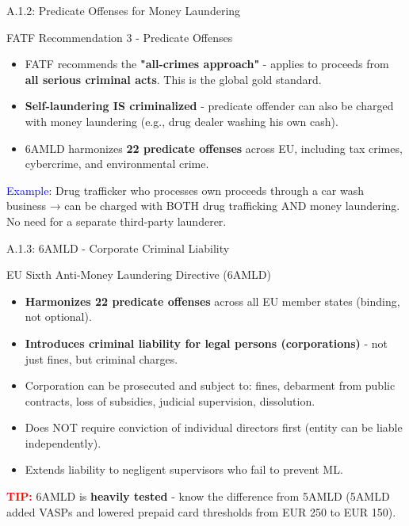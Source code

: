 \documentclass{beamer}
\begin{document}
	\begin{frame}{A.1.2: Predicate Offenses for Money Laundering}
		\begin{block}{FATF Recommendation 3 - Predicate Offenses}
			\begin{itemize}
				\item FATF recommends the \textbf{"all-crimes approach"} - applies to proceeds from \textbf{all serious criminal acts}. This is the global gold standard.
				\item \textbf{Self-laundering IS criminalized} - predicate offender can also be charged with money laundering (e.g., drug dealer washing his own cash).
				\item 6AMLD harmonizes \textbf{22 predicate offenses} across EU, including tax crimes, cybercrime, and environmental crime.
			\end{itemize}
		\end{block}
		\textcolor{blue}{Example:} Drug trafficker who processes own proceeds through a car wash business → can be charged with BOTH drug trafficking AND money laundering. No need for a separate third-party launderer.
	\end{frame}
	
	\begin{frame}{A.1.3: 6AMLD - Corporate Criminal Liability}
		\begin{block}{EU Sixth Anti-Money Laundering Directive (6AMLD)}
			\begin{itemize}
				\item \textbf{Harmonizes 22 predicate offenses} across all EU member states (binding, not optional).
				\item \textbf{Introduces criminal liability for legal persons (corporations)} - not just fines, but criminal charges.
				\item Corporation can be prosecuted and subject to: fines, debarment from public contracts, loss of subsidies, judicial supervision, dissolution.
				\item Does NOT require conviction of individual directors first (entity can be liable independently).
				\item Extends liability to negligent supervisors who fail to prevent ML.
			\end{itemize}
		\end{block}
		\textcolor{red}{\textbf{TIP:}} 6AMLD is \textbf{heavily tested} - know the difference from 5AMLD (5AMLD added VASPs and lowered prepaid card thresholds from EUR 250 to EUR 150).
	\end{frame}
	
\end{document}
